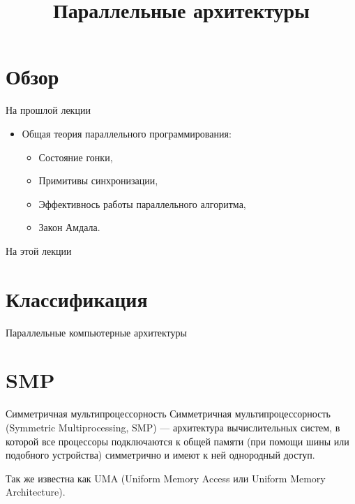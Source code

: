 

\title{Параллельные архитектуры}



\begin{frame}
\titlepage
\end{frame}

\section*{Обзор}

\begin{frame}{На прошлой лекции}

\begin{itemize}
    \item Общая теория параллельного программирования:
    \begin{itemize}
        \item Состояние гонки,
        \item Примитивы синхронизации,
        \item Эффективнось работы параллельного алгоритма,
        \item Закон Амдала.
    \end{itemize}
\end{itemize}

\end{frame}

\begin{frame}{На этой лекции}
\tableofcontents
\end{frame}

\section{Классификация}

\begin{frame}{Параллельные компьютерные архитектуры}
\centering
{}
\end{frame}

\section{SMP}

\begin{frame}{Симметричная мультипроцессорность}
Симметричная мультипроцессорность (\abbr Symmetric Multiprocessing, SMP) --- архитектура вычислительных систем, в которой все процессоры подключаются к общей памяти (при помощи шины или подобного устройства) симметрично и имеют к ней однородный доступ.

Так же известна как UMA (Uniform Memory Access или Uniform Memory Architecture).
\end{frame}

